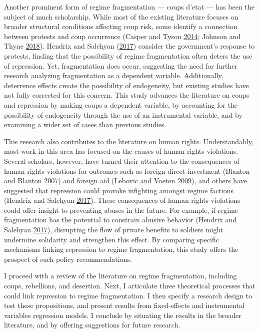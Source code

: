 \documentclass[12pt,]{article}
\begin{document}
Another prominent form of regime fragmentation --- coups d'etat --- has been the subject of much scholarship. While most of the existing literature focuses on broader structural conditions affecting coup risk, some identify a connection between protests and coup occurrence (Casper and Tyson \protect\hyperlink{ref-Casper2014}{2014}; Johnson and Thyne \protect\hyperlink{ref-Johnson2018}{2018}). Hendrix and Salehyan (\protect\hyperlink{ref-Hendrix2017}{2017}) consider the government's response to protests, finding that the possibility of regime fragmentation often deters the use of repression. Yet, fragmentation does occur, suggesting the need for further research analyzing fragmentation as a dependent variable. Additionally, deterrence effects create the possibility of endogeneity, but existing studies have not fully corrected for this concern. This study advances the literature on coups and repression by making coups a dependent variable, by accounting for the possibility of endogeneity through the use of an instrumental variable, and by examining a wider set of cases than previous studies.

This research also contributes to the literature on human rights. Understandably, most work in this area has focused on the causes of human rights violations. Several scholars, however, have turned their attention to the consequences of human rights violations for outcomes such as foreign direct investment (Blanton and Blanton \protect\hyperlink{ref-Blanton2007}{2007}) and foreign aid (Lebovic and Voeten \protect\hyperlink{ref-Lebovic2009}{2009}), and others have suggested that repression could provoke infighting amongst regime factions (Hendrix and Salehyan \protect\hyperlink{ref-Hendrix2017}{2017}). These consequences of human rights violations could offer insight to preventing abuses in the future. For example, if regime fragmentation has the potential to constrain abusive behavior (Hendrix and Salehyan \protect\hyperlink{ref-Hendrix2017}{2017}), disrupting the flow of private benefits to soldiers might undermine solidarity and strengthen this effect. By comparing specific mechanisms linking repression to regime fragmentation, this study offers the prospect of such policy recommendations.

I proceed with a review of the literature on regime fragmentation, including coups, rebellions, and desertion. Next, I articulate three theoretical processes that could link repression to regime fragmentation. I then specify a research design to test these propositions, and present results from fixed-effects and instrumental variables regression models. I conclude by situating the results in the broader literature, and by offering suggestions for future research.
\end{document}
